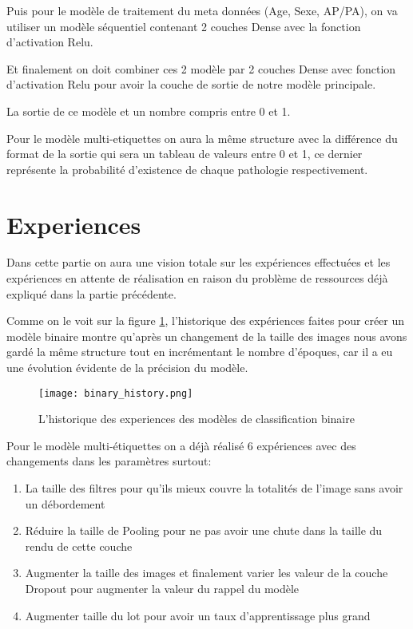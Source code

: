 Puis pour le modèle de traitement du meta données (Age, Sexe, AP/PA), on va utiliser un modèle séquentiel contenant 2 couches Dense avec la fonction d’activation Relu.

Et finalement on doit combiner ces 2 modèle par 2 couches Dense avec fonction d’activation Relu pour avoir la couche de sortie de notre modèle principale.

La sortie de ce modèle et un nombre compris entre 0 et 1.

Pour le modèle multi-etiquettes on aura la même structure avec la différence du format de la sortie qui sera un tableau de valeurs entre 0 et 1, ce dernier représente la probabilité d'existence de chaque pathologie respectivement.


\section{Experiences}

Dans cette partie on aura une vision totale sur les expériences effectuées et les expériences en attente de réalisation en raison du problème de ressources déjà expliqué dans la partie précédente.

Comme on le voit sur la figure \ref{fig:binary_history}, l'historique des expériences faites pour créer un modèle binaire montre qu’après un changement de la taille des images nous avons gardé la même structure tout en incrémentant le nombre d'époques, car il a eu une évolution évidente de la précision du modèle.

\begin{figure}[H]
    \centering
    \texttt{[image: binary\_history.png]}
    \caption{L'historique des experiences des modèles de classification binaire}\label{fig:binary_history}
\end{figure}

Pour le modèle multi-étiquettes on a déjà réalisé 6 expériences avec des changements dans les paramètres surtout:
\begin{enumerate}
    \item La taille des filtres pour qu’ils mieux couvre la totalités de l’image sans avoir un débordement
    \item Réduire la taille de Pooling pour ne pas avoir une chute dans la taille du rendu de cette couche
    \item Augmenter la taille des images et finalement varier les valeur de la couche Dropout pour augmenter la valeur du rappel du modèle
    \item Augmenter taille du lot pour avoir un taux d'apprentissage plus grand
\end{enumerate}

